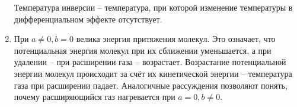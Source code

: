 \documentclass[a4paper,12pt]{article} %
\begin{document}
\begin{enumerate}
 Температура инверсии -- температура, при которой изменение температуры в дифференциальном эффекте отсутствует.
 \item При $ a \neq 0, b = 0 $ велика энергия притяжения молекул. Это означает, что потенциальная энергия молекул при их сближении уменьшается, а при удалении -- при  расширении газа -- возрастает. Возрастание потенциальной энергии молекул происходит за счёт их кинетической энергии -- температура газа при расширении падает.
 Аналогичные рассуждения позволяют понять, почему расширяющийся газ нагревается при $ a = 0, b \neq 0 $.

\end{enumerate} 
\end{document}

